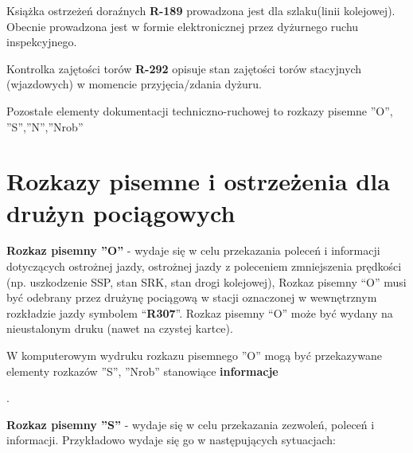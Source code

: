 Książka ostrzeżeń doraźnych \textbf{R-189} prowadzona jest dla szlaku(linii kolejowej). Obecnie prowadzona jest w formie elektronicznej przez dyżurnego ruchu inspekcyjnego.

Kontrolka zajętości torów \textbf{R-292} opisuje stan zajętości torów stacyjnych (wjazdowych) w momencie przyjęcia/zdania dyżuru.

Pozostałe elementy dokumentacji techniczno-ruchowej to rozkazy pisemne ''O'', ''S'',''N'',''Nrob''

\chapter{Rozkazy pisemne i ostrzeżenia dla drużyn pociągowych}

\textbf{Rozkaz pisemny ''O''} - wydaje się w celu przekazania poleceń i informacji dotyczących ostrożnej jazdy, ostrożnej
jazdy z poleceniem zmniejszenia prędkości (np. uszkodzenie SSP, stan SRK, stan drogi kolejowej), Rozkaz pisemny “O”
musi być odebrany przez drużynę pociągową w stacji oznaczonej w wewnętrznym rozkładzie jazdy symbolem “\textbf{R307}”.
Rozkaz pisemny “O” może być wydany na nieustalonym druku (nawet na czystej kartce).  \begin{tcolorbox}[colback=green!5!white,colframe=green!45!black,width=10cm,title=Rozkaz pisemny ''O'']
	W komputerowym wydruku rozkazu pisemnego ''O'' mogą być przekazywane elementy rozkazów ''S'', ''Nrob'' stanowiące \textbf{informacje}
\end{tcolorbox}
 . 

\textbf{Rozkaz pisemny ''S''} - wydaje się w celu przekazania zezwoleń, poleceń i informacji. Przykładowo wydaje się go w
następujących sytuacjach:

